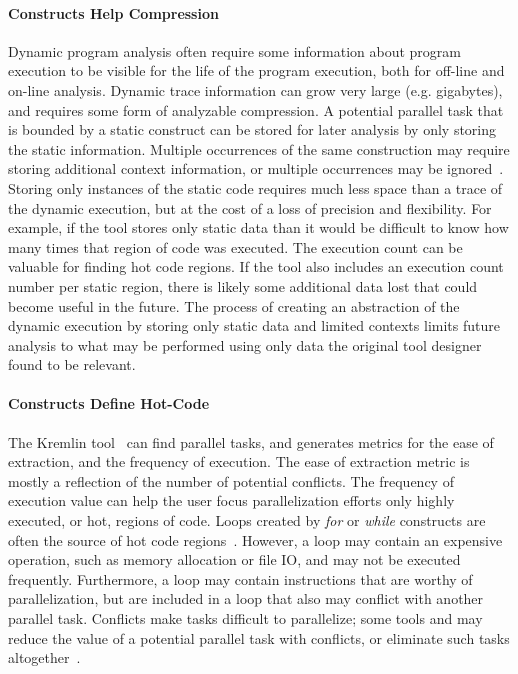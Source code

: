 {\noindent\paragraph{Constructs Help Compression}

Dynamic program analysis often require some information about program execution to be visible for the life of the program execution, both for off-line and on-line analysis.  Dynamic trace information can grow very large (e.g. gigabytes), and requires some form of analyzable compression.  A potential parallel task that is bounded by a static construct can be stored for later analysis by only storing the static information. Multiple occurrences of the same construction may require storing additional context information, or multiple occurrences may be ignored~\cite{minjang:10:micro, jeon:2011:hotpar, garcia:2011:pldi}. Storing only instances of the static code requires much less space than a trace of the dynamic execution, but at the cost of a loss of precision and flexibility.  For example, if the tool stores only static data than it would be difficult to know how many times that region of code was executed. The execution count can be valuable for finding hot code regions.  If the tool also includes an execution count number per static region, there is likely some additional data lost that could become useful in the future.  The process of creating an abstraction of the dynamic execution by storing only static data and limited contexts limits future analysis to what may be performed using only data the original tool designer found to be relevant.

\noindent\paragraph{Constructs Define Hot-Code}

The Kremlin tool~\cite{garcia:2011:pldi} can find parallel tasks, and generates metrics for the ease of extraction, and the frequency of execution.  The ease of extraction metric is mostly a reflection of the number of potential conflicts.  The frequency of execution value can help the user focus parallelization efforts only highly executed, or hot, regions of code.  Loops created by \textit{for} or \textit{while} constructs are often the source of hot code regions~\cite{bala:2000:pldi}.  However, a loop may contain an expensive operation, such as memory allocation or file IO, and may not be executed frequently.  Furthermore, a loop may contain instructions that are worthy of parallelization, but are included in a loop that also may conflict with another parallel task.  Conflicts make tasks difficult to parallelize; some tools and may reduce the value of a potential parallel task with conflicts, or eliminate such tasks altogether~\cite{garcia:2011:pldi}.

}
